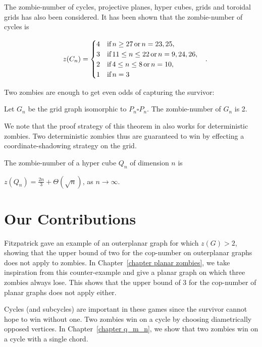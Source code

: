 The zombie-number of cycles, projective planes, hyper cubes, grids and toroidal grids has also been considered. It has been shown that the zombie-number of cycles is

\begin{theorem}
  \[z(C_n) =
  \begin{cases}
    4 & \text{if} \, n \geq 27 \, \text{or} \, n=23,25, \\
    3 & \text{if} \, 11 \leq n \leq 22 \, \text{or} \, n=9,24,26, \\
    2 & \text{if} \, 4 \leq n \leq 8 \, \text{or} \, n=10, \\
    1 & \text{if} \, n =3
\end{cases} \mperiod \]
\end{theorem}

Two zombies are enough to get even odds of capturing the survivor:
\begin{theorem}
  Let $G_n$ be the grid graph isomorphic to $P_n \square P_n$. The zombie-number of $G_n$ is 2.
\end{theorem}
We note that the proof strategy of this theorem in \cite{bonato2016probabilistic} also works for deterministic zombies. Two deterministic zombies thus are guaranteed to win by effecting a coordinate-shadowing strategy on the grid.

The zombie-number of a hyper cube $Q_n$ of dimension $n$ is
\begin{theorem}
$z(Q_n) = \frac{2n}{3} + \Theta(\sqrt{n})$, as $n \rightarrow \infty$.
\end{theorem}

\section{Our Contributions}
Fitzpatrick \cite{fitzpatrick2016deterministic} gave an example of an outerplanar graph for which $z(G) >2$, showing that the upper bound of two for the cop-number on outerplanar graphs does not apply to zombies. In Chapter~\ref{chapter planar zombies}, we take inspiration from this counter-example and give a planar graph on which three zombies always lose. This shows that the upper bound of 3 for the cop-number of planar graphs does not apply either.

Cycles (and subcycles) are important in these games since the survivor cannot hope to win without one. Two zombies win on a cycle by choosing diametrically opposed vertices. In Chapter~\ref{chapter q_m_n}, we show that two zombies win on a cycle with a single chord.
